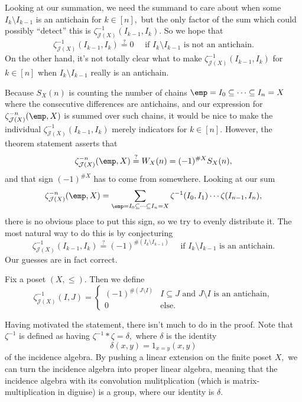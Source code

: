 Looking at our summation, we need the summand to care about when some $I_k\setminus I_{k-1}$ is an antichain for $k\in[n],$ but the only factor of the sum which could possibly ``detect'' this is $\zeta_{\mathcal J(X)}^{-1}(I_{k-1},I_k).$ So we hope that
\[\zeta_{\mathcal J(X)}^{-1}(I_{k-1},I_k)\stackrel?=0\quad\text{ if }I_k\setminus I_{k-1}\text{ is not an antichain}.\]
On the other hand, it's not totally clear what to make $\zeta_{\mathcal J(X)}^{-1}(I_{k-1},I_k)$ for $k\in[n]$ when $I_k\setminus I_{k-1}$ really is an antichain.

Because $S_X(n)$ is counting the number of chains $\emp=I_0\subseteq\cdots\subseteq I_n=X$ where the consecutive differences are antichains, and our expression for $\zeta_{\mathcal J(X)}^{-n}(\emp,X)$ is summed over such chains, it would be nice to make the individual $\zeta_{\mathcal J(X)}^{-1}(I_{k-1},I_k)$ merely indicators for $k\in[n].$ However, the theorem statement asserts that
\[\zeta_{\mathcal J(X)}^{-n}(\emp,X)\stackrel?=W_X(n)=(-1)^{\#X}S_X(n),\]
and that sign $(-1)^{\#X}$ has to come from somewhere. Looking at our sum
\[\zeta_{\mathcal J(X)}^{-n}(\emp,X)=\sum_{\emp=I_0\subseteq\cdots\subseteq I_n=X}\zeta^{-1}(I_0,I_1)\cdots\zeta(I_{n-1},I_n),\]
there is no obvious place to put this sign, so we try to evenly distribute it. The most natural way to do this is by conjecturing
\[\zeta_{\mathcal J(X)}^{-1}(I_{k-1},I_k)\stackrel?=(-1)^{\#(I_k\setminus I_{k-1})}\quad\text{ if }I_k\setminus I_{k-1}\text{ is an antichain}.\]
Our guesses are in fact correct.
\begin{lemma}
    Fix a poset $(X,\le).$ Then we define
    \[\zeta_{\mathcal J(X)}^{-1}(I,J)=\begin{cases}
        (-1)^{\#(J\setminus I)} & I\subseteq J\text{ and }J\setminus I\text{ is an antichain}, \\
        0 & \text{else}.
    \end{cases}\]
\end{lemma}
Having motivated the statement, there isn't much to do in the proof. Note that $\zeta^{-1}$ is defined as having $\zeta^{-1}*\zeta=\delta,$ where $\delta$ is the identity
\[\delta(x,y)=1_{x=y}(x,y)\]
of the incidence algebra. By pushing a linear extension on the finite poset $X,$ we can turn the incidence algebra into proper linear algebra, meaning that the incidence algebra with its convolution mulitplication (which is matrix-multiplication in diguise) is a group, where our identity is $\delta.$

